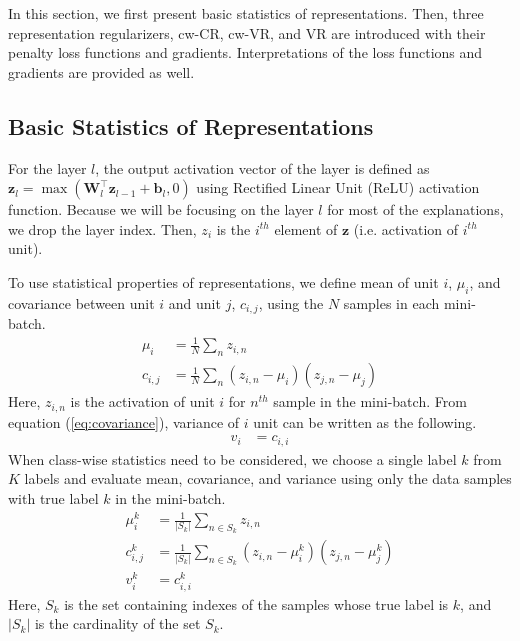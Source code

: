 \documentclass[letterpaper]{article} %
\begin{document}
In this section, we first present basic statistics of representations. Then, three representation regularizers, cw-CR, cw-VR, and VR are introduced with their penalty loss functions and gradients. Interpretations of the loss functions and gradients are provided as well. 

\subsection{Basic Statistics of Representations}
\label{subsection:stats}
For the layer $l$, the output activation vector of the layer is defined as 
$\mathbf{z}_l = \max(\mathbf{W}^\top_l \mathbf{z}_{l-1} + \mathbf{b}_l, 0)$ using Rectified Linear Unit (ReLU)
activation function. Because we will be focusing on the layer $l$ for most of the explanations, 
we drop the layer index. 
Then, $z_i$ is the $i^{th}$ element of $\mathbf{z}$ (i.e. activation of $i^{th}$ unit). 

To use statistical properties of representations, we define mean of unit $i$, $\mu_i$, and covariance 
between unit $i$ and unit $j$, $\textit{c}_{i,j}$, using the $N$ samples in each mini-batch. 
\begin{align}
    \mu_i &= \frac{1}{N} \sum_n z_{i,n}  \label{eq:mean}  \\
    \textit{c}_{i,j} &= \frac{1}{N} \sum_n (z_{i,n} - \mu_i)(z_{j,n} - \mu_j) \label{eq:covariance}
\end{align}
Here, $z_{i,n}$ is the activation of unit $i$ for $n^{th}$ sample in the mini-batch.  
From equation (\ref{eq:covariance}), variance of $i$ unit can be written as the following. 
\begin{align}
    \textit{v}_{i} &= \textit{c}_{i,i} \label{eq:variance}
\end{align}
When class-wise statistics need to be considered, we choose a single label $k$ from $K$ labels
and evaluate mean, covariance, and variance using only the data samples with true label $k$
in the mini-batch. 
\begin{align}
    \mu_i^k &= \frac{1}{|S_k|} \sum_{n \in S_k} z_{i,n} \label{eq:mean_cw} \\
    \textit{c}_{i,j}^k &= \frac{1}{|S_k|} \sum_{n \in S_k} (z_{i,n} - \mu_i^k)(z_{j,n} - \mu_j^k) \label{eq:covariance_cw}  \\  
    \textit{v}_{i}^k &= \textit{c}_{i,i}^k   \label{eq:variance_cw}
\end{align}
Here, $S_k$ is the set containing indexes of the samples whose true label is $k$, 
and $|S_k|$ is the cardinality of the set $S_k$.
\end{document}
